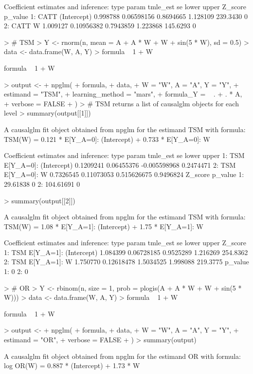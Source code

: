\documentclass[article]{jss}
\begin{document}
\begin{Schunk}
\begin{Soutput}
Coefficient estimates and inference:
   type       param tmle_est         se     lower    upper  Z_score p_value
1: CATT (Intercept) 0.998788 0.06598156 0.8694665 1.128109 239.3430       0
2: CATT           W 1.009127 0.10956382 0.7943859 1.223868 145.6293       0
\end{Soutput}
\begin{Sinput}
> # TSM
> Y <- rnorm(n, mean = A + A * W + W + sin(5 * W), sd = 0.5)
> data <- data.frame(W, A, Y)
> formula ~ 1 + W
\end{Sinput}
\begin{Soutput}
formula ~ 1 + W
\end{Soutput}
\begin{Sinput}
> output <-
+   npglm(
+     formula,
+     data,
+     W = "W", A = "A", Y = "Y",
+     estimand = "TSM",
+     learning_method = "mars",
+     formula_Y = ~ . + . * A,
+     verbose = FALSE
+   )
> # TSM returns a list of causalglm objects for each level
> summary(output[[1]])
\end{Sinput}
\begin{Soutput}
A causalglm fit object obtained from npglm for the estimand TSM with formula: 
TSM(W) = 0.121 * E[Y_{A=0}]: (Intercept) + 0.733 * E[Y_{A=0}]: W

Coefficient estimates and inference:
   type                   param  tmle_est         se        lower     upper
1:  TSM E[Y_{A=0}]: (Intercept) 0.1209241 0.06455376 -0.005598968 0.2474471
2:  TSM           E[Y_{A=0}]: W 0.7326545 0.11073053  0.515626675 0.9496824
     Z_score p_value
1:  29.61838       0
2: 104.61691       0
\end{Soutput}
\begin{Sinput}
> summary(output[[2]])
\end{Sinput}
\begin{Soutput}
A causalglm fit object obtained from npglm for the estimand TSM with formula: 
TSM(W) = 1.08 * E[Y_{A=1}]: (Intercept) + 1.75 * E[Y_{A=1}]: W

Coefficient estimates and inference:
   type                   param tmle_est         se     lower    upper  Z_score
1:  TSM E[Y_{A=1}]: (Intercept) 1.084399 0.06728185 0.9525289 1.216269 254.8362
2:  TSM           E[Y_{A=1}]: W 1.750770 0.12618478 1.5034525 1.998088 219.3775
   p_value
1:       0
2:       0
\end{Soutput}
\begin{Sinput}
> # OR
> Y <- rbinom(n, size = 1, prob = plogis(A + A * W + W + sin(5 * W)))
> data <- data.frame(W, A, Y)
> formula ~ 1 + W
\end{Sinput}
\begin{Soutput}
formula ~ 1 + W
\end{Soutput}
\begin{Sinput}
> output <-
+   npglm(
+     formula,
+     data,
+     W = "W", A = "A", Y = "Y",
+     estimand = "OR",
+     verbose = FALSE
+   )
> summary(output)
\end{Sinput}
\begin{Soutput}
A causalglm fit object obtained from npglm for the estimand OR with formula: 
log OR(W) = 0.887 * (Intercept) + 1.73 * W


\end{Soutput}
\end{Schunk}
\end{document}

